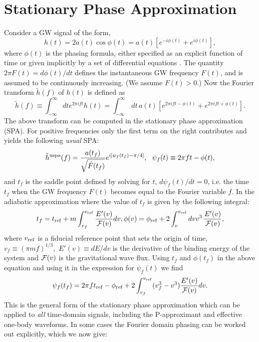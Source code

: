 \section{Stationary Phase Approximation}
Consider a GW signal of the form,
\begin {equation}
h(t)=2a(t)\cos\phi(t)= a(t) \left [ e^{-i \phi(t)} + e^{i \phi(t)} \right ],
\end {equation}
where $\phi(t)$ is the phasing formula, either specified as an explicit
function of time or given implicitly by a set of differential equations
\cite{dis3}.  The quantity $2\pi F(t) = {d\phi(t)}/{dt}$ defines the instantaneous
GW frequency $F(t)$, and is assumed to be
continuously increasing. (We assume $F(t)>0$.)
 Now the Fourier transform $\tilde h(f)$ of $h(t)$ is defined as
\begin {equation}
\tilde{h}(f) \equiv \int_{-\infty}^{\infty} dt e^{2\pi ift} h(t)
            = \int_{-\infty}^{\infty}\,dt\, a(t) 
              \left[ e^{2\pi i f t - \phi(t)}  +  e^{2\pi ift +\phi(t)}\right ].
\end {equation}
The above transform can be computed in the stationary
phase approximation (SPA). For positive frequencies only the first term
on the right  contributes and yields the following {\it usual} SPA:
\begin {equation}
\tilde{h}^{\rm uspa}(f)= \frac {a(t_f)} {\sqrt {\dot{F}(t_f)}}
e^{ i\left[ \psi_f(t_f) -\pi/4\right]},\ \ 
\psi_f(t) \equiv  2 \pi f t -\phi(t), 
\label{eq:inspiralspa1}
\end {equation}
and $t_f$ is the saddle point defined by solving for $t$, $ d \psi_f(t)/d t = 0$,
i.e. the time $t_f$ when the GW frequency $F(t)$ becomes equal to the 
Fourier variable $f$. In the adiabatic approximation where 
the value of $t_f$ is given by the following integral:
\begin{equation}
t_f = t_{\rm ref} + m \int_{v_f}^{v_{\rm ref}} \frac{E'(v)}{{\cal F}(v)} dv,
\phi (v) = \phi_{\rm ref} + 2 \int_v^{v_{\rm ref}} dv v^3 \, \frac{E'(v)}{{\cal F}(v)},
\label{eq:InspiralTimeAndPhaseFuncs}
\end{equation}
where $v_{\rm ref}$ is a fiducial reference point that sets the origin of
time, $v_f \equiv (\pi m f)^{1/3},$ $E'(v)\equiv dE/dv$ is the derivative of
the binding energy of the system and ${\cal F}(v)$ is the gravitational wave
flux. 
Using $t_f$ and $\phi(t_f)$ in the above equation and 
using it in the expression for $\psi_f(t)$ we find
\begin{equation}
 \psi_f(t_f) = 2 \pi f t_{\rm ref} - \phi_{\rm ref} + 2\int_{v_f}^{v_{\rm ref}} 
(v_f^3 - v^3)
\frac{E'(v)}{{\cal {\cal F}}(v)} dv .
\label{eq:InspiralFourierPhase}
\end{equation}
This is the general form of the stationary phase approximation which
can be applied to {\it all} time-domain signals, including the P-approximant
and effective one-body waveforms. In some cases the Fourier domain phasing
can be worked out explicitly, which we now give:

